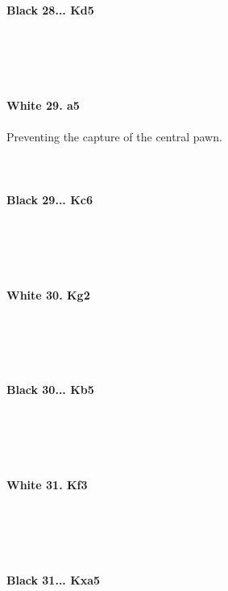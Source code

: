 \documentclass{article}
\begin{document}

\\
\\
\textbf{Black 28... Kd5}\\
\\
\\
\\

\\
\\
\textbf{White 29. a5}\\
\\
Preventing the capture of the central pawn.\\
\\

\\
\\
\textbf{Black 29... Kc6}\\
\\
\\
\\

\\
\\
\textbf{White 30. Kg2}\\
\\
\\
\\

\\
\\
\textbf{Black 30... Kb5}\\
\\
\\
\\

\\
\\
\textbf{White 31. Kf3}\\
\\
\\
\\

\\
\\
\textbf{Black 31... Kxa5}\\
\\
\\
\end{document}
